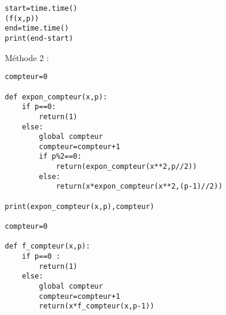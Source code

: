\begin{exercice}
\begin{enumerate}
\begin{solution}
\begin{verbatim}
start=time.time()
(f(x,p))
end=time.time()
print(end-start)  
\end{verbatim}

Méthode 2 :\\
\begin{verbatim}
compteur=0

def expon_compteur(x,p):
    if p==0:
        return(1)
    else:
        global compteur
        compteur=compteur+1
        if p%2==0:
            return(expon_compteur(x**2,p//2))
        else:
            return(x*expon_compteur(x**2,(p-1)//2))

print(expon_compteur(x,p),compteur)

compteur=0

def f_compteur(x,p):
    if p==0 :
        return(1)
    else:
        global compteur
        compteur=compteur+1
        return(x*f_compteur(x,p-1))
\end{verbatim}
\end{solution}
\end{enumerate}
\end{exercice}



